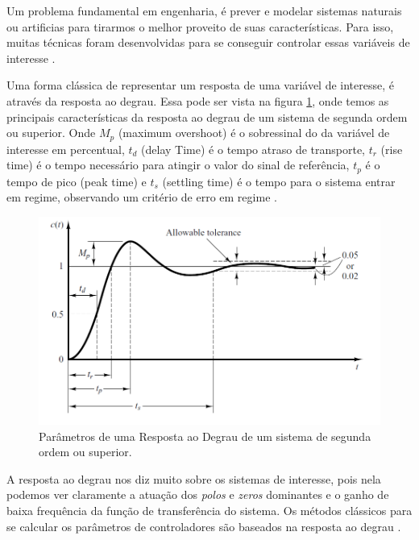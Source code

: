 Um problema fundamental em engenharia, é prever e modelar sistemas naturais ou artificias para tirarmos o melhor proveito de suas características. Para isso, muitas técnicas foram desenvolvidas para se conseguir controlar essas variáveis de interesse \cite{Levine1996}.

Uma forma clássica de representar um resposta de uma variável de interesse, é através da resposta ao degrau. Essa pode ser vista na figura \ref{fig:transient_ogata_p170}, onde temos as principais características da resposta ao degrau de um sistema de segunda ordem ou superior. Onde \textit{$M_p$} (maximum overshoot) é o sobressinal do da variável de interesse em percentual, \textit{$t_d$} (delay Time) é o tempo atraso de transporte, \textit{$t_r$} (rise time) é o tempo necessário para atingir o valor do sinal de referência, \textit{$t_p$} é o tempo de pico (peak time) e \textit{$t_s$} (settling time) é o tempo para o sistema entrar em regime, observando um critério de erro em regime \cite{Ogata}.

\begin{figure}[!ht]
  \caption{Parâmetros de uma Resposta ao Degrau de um sistema de segunda ordem ou superior.}
  \begin{center}
      \includegraphics[scale=0.5]{img/transient_ogata_p170}
  \end{center}
  \label{fig:transient_ogata_p170}
\end{figure}

A resposta ao degrau nos diz muito sobre os sistemas de interesse, pois nela podemos ver claramente a atuação dos \textit{polos} e \textit{zeros} dominantes e o ganho de baixa frequência da função de transferência do sistema. Os métodos clássicos para se calcular os parâmetros de controladores são baseados na resposta ao degrau \cite{Ogata}. 

